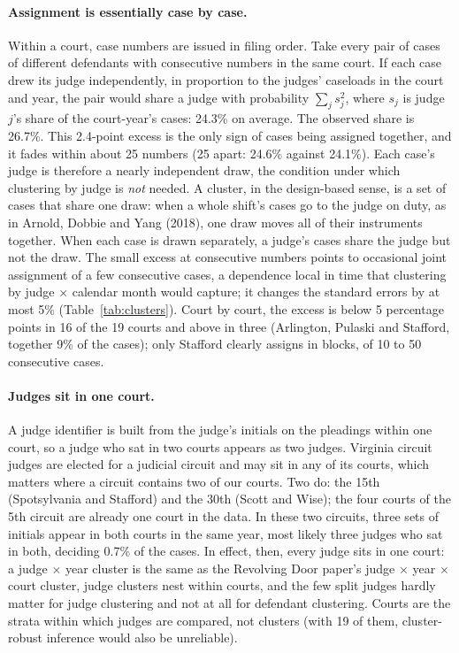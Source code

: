 \documentclass[11pt]{article}
\begin{document}
\paragraph{Assignment is essentially case by case.} Within a court, case numbers are issued in filing order. Take every pair of cases of different defendants with consecutive numbers in the same court. If each case drew its judge independently, in proportion to the judges' caseloads in the court and year, the pair would share a judge with probability $\sum_j s_j^2$, where $s_j$ is judge $j$'s share of the court-year's cases: 24.3\% on average. The observed share is 26.7\%. This 2.4-point excess is the only sign of cases being assigned together, and it fades within about 25 numbers (25 apart: 24.6\% against 24.1\%). Each case's judge is therefore a nearly independent draw, the condition under which clustering by judge is \emph{not} needed. A cluster, in the design-based sense, is a set of cases that share one draw: when a whole shift's cases go to the judge on duty, as in Arnold, Dobbie and Yang (2018), one draw moves all of their instruments together. When each case is drawn separately, a judge's cases share the judge but not the draw. The small excess at consecutive numbers points to occasional joint assignment of a few consecutive cases, a dependence local in time that clustering by judge $\times$ calendar month would capture; it changes the standard errors by at most 5\% (Table~\ref{tab:clusters}). Court by court, the excess is below 5 percentage points in 16 of the 19 courts and above in three (Arlington, Pulaski and Stafford, together 9\% of the cases); only Stafford clearly assigns in blocks, of 10 to 50 consecutive cases.

\paragraph{Judges sit in one court.} A judge identifier is built from the judge's initials on the pleadings within one court, so a judge who sat in two courts appears as two judges. Virginia circuit judges are elected for a judicial circuit and may sit in any of its courts, which matters where a circuit contains two of our courts. Two do: the 15th (Spotsylvania and Stafford) and the 30th (Scott and Wise); the four courts of the 5th circuit are already one court in the data. In these two circuits, three sets of initials appear in both courts in the same year, most likely three judges who sat in both, deciding 0.7\% of the cases. In effect, then, every judge sits in one court: a judge $\times$ year cluster is the same as the Revolving Door paper's judge $\times$ year $\times$ court cluster, judge clusters nest within courts, and the few split judges hardly matter for judge clustering and not at all for defendant clustering. Courts are the strata within which judges are compared, not clusters (with 19 of them, cluster-robust inference would also be unreliable).
\end{document}
